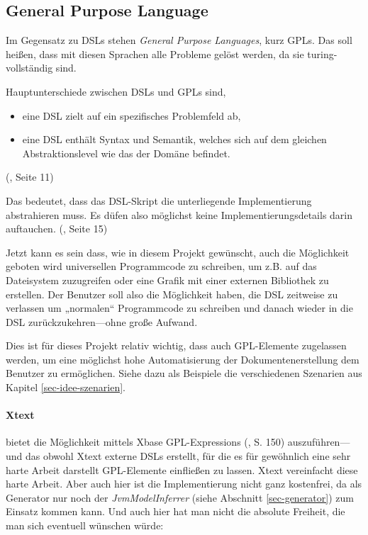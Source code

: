 \subsection{General Purpose Language}\label{sec-gpl}

Im Gegensatz zu DSLs stehen \emph{General Purpose Languages}, kurz GPLs.
Das soll heißen, dass mit diesen Sprachen alle Probleme gelöst werden, da
sie turing-vollständig sind.

Hauptunterschiede zwischen DSLs und GPLs sind,

\begin{itemize}
  \item eine DSL zielt auf ein spezifisches Problemfeld ab,
  \item eine DSL enthält Syntax und Semantik, welches sich auf dem gleichen
        Abstraktionslevel wie das der Domäne befindet.
\end{itemize}

(\cite{dsls}, Seite 11)

Das bedeutet, dass das DSL-Skript die unterliegende Implementierung abstrahieren
muss. Es düfen also möglichst keine Implementierungsdetails darin auftauchen.
(\cite{dsls}, Seite 15)

Jetzt kann es sein dass, wie in diesem Projekt gewünscht,
auch die Möglichkeit geboten wird universellen Programmcode zu schreiben,
um z.B. auf das Dateisystem zuzugreifen oder eine Grafik mit einer
externen Bibliothek zu erstellen. Der Benutzer soll also die
Möglichkeit haben, die DSL zeitweise zu verlassen um „normalen“ Programmcode
zu schreiben und danach wieder in die DSL zurückzukehren---ohne große
Aufwand.

Dies ist für dieses Projekt relativ wichtig, dass auch GPL-Elemente zugelassen
werden, um eine möglichst hohe Automatisierung der Dokumentenerstellung
dem Benutzer zu ermöglichen. Siehe dazu als Beispiele
die verschiedenen Szenarien aus Kapitel \ref{sec-idee-szenarien}.

\paragraph{Xtext} bietet die Möglichkeit mittels Xbase GPL-Expressions
(\cite{xtext}, S. 150)
auszuführen---und das obwohl Xtext externe DSLs erstellt, für die es für
gewöhnlich eine sehr harte Arbeit darstellt GPL-Elemente einfließen zu lassen.
Xtext vereinfacht diese harte Arbeit. Aber auch hier ist die Implementierung
nicht ganz kostenfrei, da als Generator nur noch der \emph{JvmModelInferrer}
(siehe Abschnitt \ref{sec-generator}) zum Einsatz kommen kann.
Und auch hier hat man nicht die absolute Freiheit, die man sich eventuell
wünschen würde:

